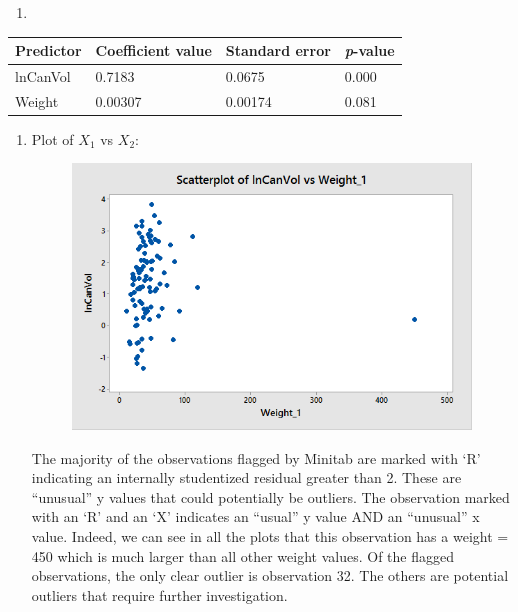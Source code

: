 \documentclass{article}
\providecommand{\tightlist}{%
      \setlength{\itemsep}{0pt}\setlength{\parskip}{0pt}}
\begin{document}
\begin{enumerate}
\def\labelenumi{\alph{enumi})}
\setcounter{enumi}{1}
\item
\end{enumerate}

\begin{longtable}[c]{@{}llll@{}}
\toprule
Predictor & Coefficient value & Standard error &
\emph{p}-value\tabularnewline
\midrule
\endhead
lnCanVol & 0.7183 & 0.0675 & 0.000\tabularnewline
Weight & 0.00307 & 0.00174 & 0.081\tabularnewline
\bottomrule
\end{longtable}

\begin{enumerate}
\def\labelenumi{\alph{enumi})}
\setcounter{enumi}{2}
\tightlist
\item
  Plot of \(X_1\) vs \(X_2\):

\begin{figure}[h!]
 \centering
 \includegraphics[scale=.5]{./images/scatterplot_lnCanVol-vs-Weight.png}
\end{figure}

The majority of the observations flagged by Minitab are marked with `R'
indicating an internally studentized residual greater than 2. These are
``unusual'' y values that could potentially be outliers. The observation
marked with an `R' and an `X' indicates an ``usual'' y value AND an
``unusual'' x value. Indeed, we can see in all the plots that this
observation has a weight = 450 which is much larger than all other
weight values. Of the flagged observations, the only clear outlier is
observation 32. The others are potential outliers that require further
investigation.
\end{enumerate}
\end{document}
